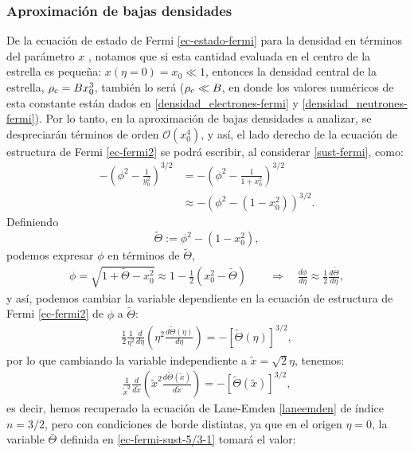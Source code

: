 \subsubsection{Aproximación de bajas densidades}
De la ecuación de estado de Fermi \eqref{ec-estado-fermi} para la densidad en términos del parámetro $x$ , notamos que si esta cantidad evaluada en el centro de la estrella es peque\~na: $x(\eta=0)=x_0\ll1$, entonces la densidad central de la estrella, $\rho_{\rm c}=Bx_0^3$, también lo será ($\rho_{\rm c}\ll B$, en donde los valores numéricos de esta constante están dados en \eqref{densidad_electrones-fermi} y \eqref{densidad_neutrones-fermi}). Por lo tanto, en la aproximación de bajas densidades a analizar, se despreciarán términos de orden $\mathcal{O}(x_0^4)$, y así, el lado derecho de la ecuación de estructura de Fermi \eqref{ec-fermi2} se podrá escribir, al considerar \eqref{sust-fermi}, como:
\begin{align}
 -\left(\phi^2-\frac{1}{y_0^2}\right)^{3/2}&=-\left(\phi^2-\frac{1}{1+x_0^2}\right)^{3/2}\\
&\approx-\left(\phi^2-(1-x_0^2)\right)^{3/2}.
\end{align}
Definiendo
\begin{equation}\label{ec-fermi-sust-5/3-1}
 \widetilde{\Theta}:=\phi^2-(1-x_0^2),
\end{equation}
podemos expresar $\phi$ en términos de $\widetilde{\Theta}$,
\begin{align}
\phi=\sqrt{1+\widetilde{\Theta}-x_0^2}\approx1-\frac{1}{2}\left(x_0^2-\widetilde{\Theta}\right)\qquad\Rightarrow\quad \frac{d\phi}{d\eta}\approx\frac{1}{2}\frac{d\widetilde{\Theta}}{d\eta},\label{ec-fermi-sust-5/3}
\end{align}
y así, podemos cambiar la variable dependiente en la ecuación de estructura de Fermi \eqref{ec-fermi2} de $\phi$ a $\widetilde{\Theta}$:
\begin{align}\label{ec-fermi-ec5/3-1}
 \frac{1}{2}\frac{1}{\eta^2}\frac{d}{d\eta}\left(\eta^2\frac{d\widetilde{\Theta}(\eta)}{d\eta}\right)=-\left[\widetilde{\Theta}(\eta)\right]^{3/2},
\end{align}
por lo que cambiando la variable independiente a $\widetilde{x}=\sqrt{2}\eta$, tenemos:
\begin{align}\label{ec-fermi-ec5/3-2}
 \frac{1}{\widetilde{x}^2}\frac{d}{d\widetilde{x}}\left(\widetilde{x}^2\frac{d\widetilde{\Theta}(\widetilde{x})}{d\widetilde{x}}\right)=-\left[\widetilde{\Theta}(\widetilde{x})\right]^{3/2},
\end{align}
es decir, hemos recuperado la ecuación de Lane-Emden  \eqref{laneemden} de índice $n=3/2$, pero con condiciones de borde distintas, ya que en el origen $\eta=0$, la variable $\bar{\Theta}$  definida en \eqref{ec-fermi-sust-5/3-1} tomará el valor:
